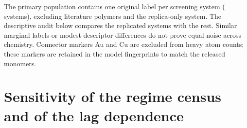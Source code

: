 \documentclass[11pt]{article}
\begin{document}
The primary population contains one original label per screening system (\mlNSys{} systems),
excluding literature polymers and the replica-only system. The descriptive audit below compares
the replicated systems with the rest. Similar marginal labels or modest descriptor differences
do not prove equal noise across chemistry. Connector markers Au and Cu are excluded from heavy
atom counts; these markers are retained in the model fingerprints to match the released monomers.

\begin{table}[!htbp]
\centering\small
\caption{Sample audit. The first two numeric columns are medians; the final column is the
mean difference (replicated minus rest) divided by the standard deviation in the rest.
These are descriptive comparisons, not equivalence tests.}\label{si:tab:sample}

\end{table}

\begin{table}[!htbp]
\centering\small
\caption{Sensitivity of reliability to the denominator population. The noise estimate uses the
same \nRep{} replicated systems in both columns; the broader population additionally includes
literature trajectories and repeated labels.}\label{si:tab:population}

\end{table}

\section{Sensitivity of the regime census and of the lag dependence}\label{si:sec:sens}
\begin{table}[!htbp]
\centering
\caption{Sensitivity of the regime census to the lag window used to fit the effective exponent.
The main text uses 0.2 to 0.6.}\label{si:tab:sens-window}
\resizebox{\textwidth}{!}{}
\end{table}

\begin{table}[!htbp]
\centering
\caption{Sensitivity of the lag dependence in the \nLong{} long runs to the reference lag
$\tau_{\mathrm{ref}}$. The main text uses \SI{25}{\nano\second}.}\label{si:tab:sens-ref}

\end{table}
\end{document}
